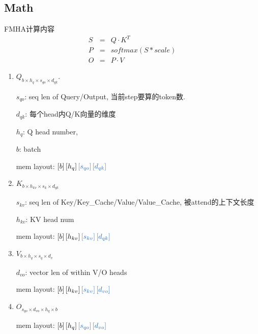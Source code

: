 \subsection{Math}

FMHA计算内容
\begin{eqnarray}
    S &=& Q \cdot K^T\\
    P &=& softmax(S * scale) \\
    O &=& P \cdot V
\end{eqnarray}

\begin{enumerate}
    \item $Q_{b \times h_q \times s_{qo}\times d_{qk}}$.

	$s_{qo}$: seq len of Query/Output, 当前step要算的token数.

	$d_{qk}$: 每个head内Q/K向量的维度

	$h_q$: Q head number, 

	$b$: batch

	mem layout: $\left[b\right]\left[h_q\right]\color{NavyBlue}{\left[s_{qo}\right]\left[d_{qk}\right]}$
    \item $K_{b\times h_{kv} \times s_{k}\times d_{qk}}$ %

	$s_{kv}$: seq len of Key/Key\_Cache/Value/Value\_Cache, 被attend的上下文长度

	$h_{kv}$: KV head num
	
	mem layout: $\left[b\right]\left[h_{kv}\right]\color{NavyBlue}{\left[s_{kv}\right]\left[d_{qk}\right]}$
    \item $V_{b\times h_{q}\times s_q \times d_v}$%

	$d_{vo}$: vector len of within V/O heads

	mem layout: $\left[b\right]\left[h_{kv}\right]\color{NavyBlue}{\left[s_{kv}\right]\left[d_{vo}\right]}$
    \item $O_{s_{qo}\times d_{vo}\times h_q\times b}$
	
	mem layout: $\left[b\right]\left[h_{q}\right]\color{NavyBlue}{\left[s_{qo}\right]\left[d_{vo}\right]}$
\end{enumerate}
